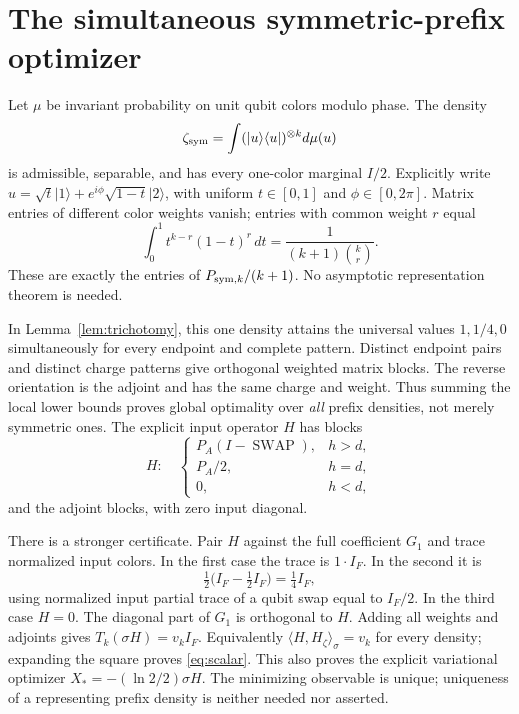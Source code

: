 \documentclass[11pt]{article}
\newcommand{\ket}[1]{\lvert #1\rangle}
\newcommand{\bra}[1]{\langle #1\rvert}
\newcommand{\SWAP}{\operatorname{SWAP}}
\begin{document}
\section{The simultaneous symmetric-prefix optimizer}

Let $\mu$ be invariant probability on unit qubit colors modulo phase.
The density
\[
 \zeta_{\rm sym}=\int(\ket u\bra u)^{\otimes k}d\mu(u)
\]
is admissible, separable, and has every one-color marginal $I/2$.
Explicitly write $u=\sqrt t\ket1+e^{i\phi}\sqrt{1-t}\ket2$,
with uniform $t\in[0,1]$ and $\phi\in[0,2\pi]$. Matrix entries
of different color weights vanish; entries with common weight $r$ equal
\[
 \int_0^1t^{k-r}(1-t)^r\,dt
   =\frac1{(k+1)\binom{k}{r}}.
\]
These are exactly the entries of $P_{{\rm sym},k}/(k+1)$.
No asymptotic representation theorem is needed.

In Lemma~\ref{lem:trichotomy}, this one density attains the universal
values $1,1/4,0$ simultaneously for every endpoint and complete pattern.
Distinct endpoint pairs and distinct charge patterns give orthogonal
weighted matrix blocks. The reverse orientation is the adjoint and has
the same charge and weight. Thus summing the local lower bounds proves
global optimality over \emph{all} prefix densities, not merely symmetric
ones. The explicit input operator $H$ has blocks
\begin{equation}\label{eq:Hblocks}
 H:\quad
 \begin{cases}
 P_A(I-\SWAP),&h>d,\\
 P_A/2,&h=d,\\
 0,&h<d,
 \end{cases}
\end{equation}
and the adjoint blocks, with zero input diagonal.

There is a stronger certificate. Pair $H$ against the full coefficient
$G_1$ and trace normalized input colors. In the first case the trace
is $1\cdot I_F$. In the second it is
\[
 \tfrac12\bigl(I_F-\tfrac12 I_F\bigr)=\tfrac14 I_F,
\]
using normalized input partial trace of a qubit swap equal to $I_F/2$.
In the third case $H=0$. The diagonal part of $G_1$ is orthogonal to
$H$. Adding all weights and adjoints gives $T_k(\sigma H)=v_kI_F$.
Equivalently $\langle H,H_\zeta\rangle_\sigma=v_k$ for every density;
expanding the square proves \eqref{eq:scalar}. This also proves the
explicit variational optimizer $X_*=-(\ln2/2)\sigma H$.
The minimizing observable is unique; uniqueness of a representing
prefix density is neither needed nor asserted.
\end{document}
